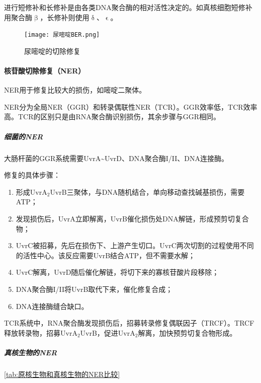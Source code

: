 进行短修补和长修补是由各类DNA聚合酶的相对活性决定的。如真核细胞短修补用聚合酶$\upbeta$，长修补则使用$\updelta$、$\upvarepsilon$。

\begin{figure}[htbp]
	\centering
	\texttt{[image: 尿嘧啶BER.png]}
	\caption{尿嘧啶的切除修复}
	\label{fig:ber}
\end{figure}

\paragraph{核苷酸切除修复（NER）}

NER用于修复比较大的损伤，如嘧啶二聚体。

NER分为全局NER（GGR）和转录偶联性NER（TCR）。GGR效率低，TCR效率高。TCR的区别只是由RNA聚合酶识别损伤，其余步骤与GGR相同。

\subparagraph{细菌的NER}

大肠杆菌的GGR系统需要UvrA\textasciitilde UvrD、DNA聚合酶I/II、DNA连接酶。

修复的具体步骤：

\begin{enumerate}
	\item 形成UvrA$_{2}$UvrB三聚体，与DNA随机结合，单向移动查找碱基损伤，需要ATP；
	\item 发现损伤后，UvrA立即解离，UvrB催化损伤处DNA解链，形成预剪切复合物；
	\item UvrC被招募，先后在损伤下、上游产生切口。UvrC两次切割的过程使用不同的活性中心。该反应需要UvrB结合ATP，但不需要水解；
	\item UvrC解离，UvrD随后催化解链，将切下来的寡核苷酸片段移除；
	\item DNA聚合酶I/II将UvrB取代下来，催化修复合成；
	\item DNA连接酶缝合缺口。
\end{enumerate}

TCR系统中，RNA聚合酶发现损伤后，招募转录修复偶联因子（TRCF）。TRCF释放转录物，招募UvrA$_{2}$UvrB，促进UvrA$_{2}$解离，加快预剪切复合物形成。

\subparagraph{真核生物的NER}


\autoref{tab:原核生物和真核生物的NER比较}

